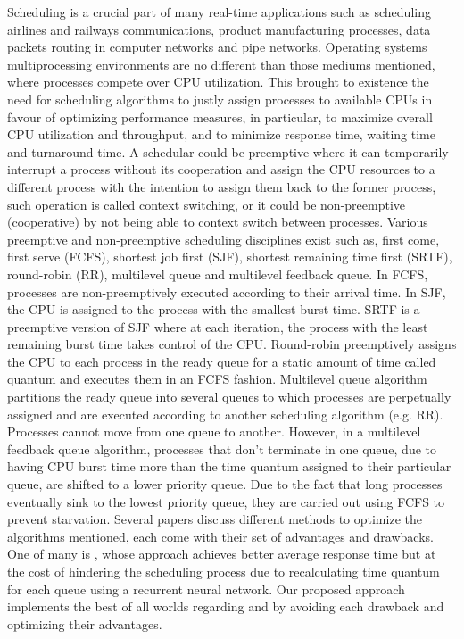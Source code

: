 \documentclass[conference]{IEEEtran}
\begin{document}
Scheduling is a crucial part of many real-time applications such as scheduling airlines and railways communications, product manufacturing processes, data packets routing in computer networks and pipe networks. Operating systems multiprocessing environments are no different than those mediums mentioned, where processes compete over CPU utilization. This brought to existence the need for scheduling algorithms to justly assign processes to available CPUs in favour of optimizing performance measures, in particular, to maximize overall CPU utilization and throughput, and to minimize response time, waiting time and turnaround time. A schedular could be preemptive where it can temporarily interrupt a process without its cooperation and assign the CPU resources to a different process with the intention to assign them back to the former process, such operation is called context switching, or it could be non-preemptive (cooperative) by not being able to context switch between processes. Various preemptive and non-preemptive scheduling disciplines exist such as, first come, first serve (FCFS), shortest job first (SJF), shortest remaining time first (SRTF), round-robin (RR), multilevel queue and multilevel feedback queue. In FCFS, processes are non-preemptively executed according to their arrival time. In SJF, the CPU is assigned to the process with the smallest burst time. SRTF is a preemptive version of SJF where at each iteration, the process with the least remaining burst time takes control of the CPU. Round-robin preemptively assigns the CPU to each process in the ready queue for a static amount of time called quantum and executes them in an FCFS fashion. Multilevel queue algorithm partitions the ready queue into several queues to which processes are perpetually assigned and are executed according to another scheduling algorithm (e.g. RR). Processes cannot move from one queue to another. However, in a multilevel feedback queue algorithm, processes that don't terminate in one queue, due to having CPU burst time more than the time quantum assigned to their particular queue, are shifted to a lower priority queue. Due to the fact that long processes eventually sink to the lowest priority queue, they are carried out using FCFS to prevent starvation. Several papers discuss different methods to optimize the algorithms mentioned, each come with their set of advantages and drawbacks. One of many is \cite{b2}, whose approach achieves better average response time but at the cost of hindering the scheduling process due to recalculating time quantum for each queue using a recurrent neural network. Our proposed approach implements the best of all worlds regarding \cite{b1} and \cite{b3} by avoiding each drawback and optimizing their advantages.
\end{document}
